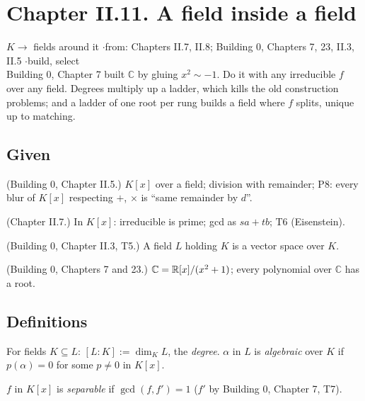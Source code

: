 \section*{Chapter II.11. A field inside a field}
\begin{center}
{\normalsize $K \to$ fields around it \quad$\cdot$\quad from: Chapters II.7, II.8; Building 0, Chapters 7, 23, II.3, II.5 \quad$\cdot$\quad build, select}\\[4pt]
{\small Building 0, Chapter 7 built $\mathbb{C}$ by gluing $x^2 \sim -1$. Do it with any irreducible $f$ over any field. Degrees multiply up a ladder, which kills the old construction problems; and a ladder of one root per rung builds a field where $f$ splits, unique up to matching.}
\end{center}

\subsection*{Given}

\begin{lines}
\item[\lab{G1}] (Building 0, Chapter II.5.) $K[x]$ over a field; division with remainder; P8: every blur of $K[x]$ respecting $+$, $\times$ is ``same remainder by $d$''.
\item[\lab{G2}] (Chapter II.7.) In $K[x]$: irreducible is prime; gcd as $sa + tb$; T6 (Eisenstein).
\item[\lab{G3}] (Building 0, Chapter II.3, T5.) A field $L$ holding $K$ is a vector space over $K$.
\item[\lab{G4}] (Building 0, Chapters 7 and 23.) $\mathbb{C} = \mathbb{R}[x]/(x^2 + 1)$; every polynomial over $\mathbb{C}$ has a root.
\end{lines}

\subsection*{Definitions}

\begin{lines}
\item[\lab{D1}] For fields $K \subseteq L$: $[L : K] := \dim_K L$, the \emph{degree}. $\alpha$ in $L$ is \emph{algebraic} over $K$ if $p(\alpha) = 0$ for some $p \ne 0$ in $K[x]$.
\item[\lab{D2}] $f$ in $K[x]$ is \emph{separable} if $\gcd(f, f') = 1$ ($f'$ by Building 0, Chapter 7, T7).
\end{lines}

